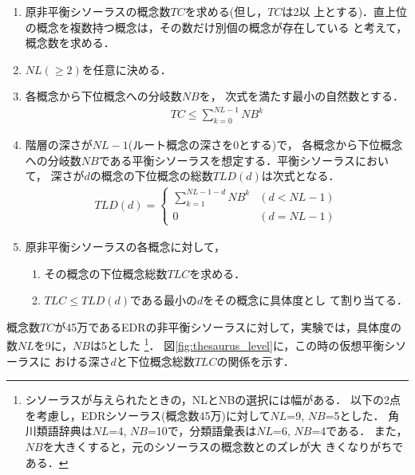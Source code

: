 \begin{enumerate}
 \item 原非平衡シソーラスの概念数$TC$を求める\hspace{-0.2mm}(但し，\hspace{-0.5mm}$TC$は2以
   上とする)．\hspace{-0.5mm}直上位の概念を複数持つ概念は，その数だけ別個の概念が存在している
     と考えて，概念数を求める．
 \item $NL(\ge 2)$を任意に決める．
 \item 各概念から下位概念への分岐数$NB$を，
       次式を満たす最小の自然数とする．
\begin{eqnarray*}
  TC \leq \displaystyle \sum_{k=0}^{NL-1}NB^k 
\end{eqnarray*}
 \item 階層の深さが$NL-1$(ルート概念の深さを0とする)で，
     各概念から下位概念への分岐数$NB$である平衡シソーラスを想定する．\hspace{-0.5mm}平衡シソーラスにおいて，
     深さが$d$の概念の下位概念の総数$TLD(d)$は次式となる．
     \begin{eqnarray*}
       TLD(d) = \left\{
       \begin{array}{ll}
         \displaystyle \sum_{k=1}^{NL-1-d}NB^k & (d < NL-1)\\
         0                     & (d = NL-1)
       \end{array}
     \right.
   \end{eqnarray*}
 \item 原非平衡シソーラスの各概念に対して，
 \begin{enumerate}
  \item その概念の下位概念総数$TLC$を求める．
  \item $TLC \leq TLD(d)$である最小の$d$をその概念に{\dg 具体度}とし
        て割り当てる．
 \end{enumerate}
\end{enumerate}

概念数$TC$が45万であるEDRの非平衡シソーラスに対して，\hspace{-0.3mm}実験では，\hspace{-0.3mm}具体度の数$NL$を9に，$NB$は5とした
\footnote{
シソーラスが与えられたときの，NLとNBの選択には幅がある．
以下の2点を考慮し，EDRシソーラス(概念数45万)に対して$NL$=9, $NB$=5とした．
角川類語辞典は$NL$=4, $NB$=10で，分類語彙表は$NL$=6, $NB$=4である．
また，$NB$を大きくすると，元のシソーラスの概念数とのズレが大
きくなりがちである．}．
図\ref{fig:thesaurus_level}に，この時の仮想平衡シソーラスに
おける深さ$d$と下位概念総数$TLC$の関係を示す．

